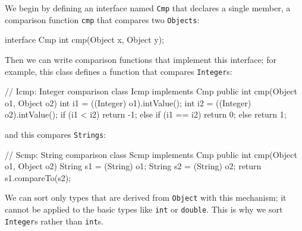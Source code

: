 We begin by defining an interface named \verb'Cmp' that declares a single
member, a comparison function \verb'cmp' that compares two \verb'Objects':
\begin{wellcode}
    interface Cmp {
        int cmp(Object x, Object y);
    }
\end{wellcode}
Then we can write comparison functions that implement this interface; for
example, this class defines a function that compares \verb'Integer's:
\begin{wellcode}
    // Icmp: Integer comparison
    class Icmp implements Cmp {
        public int cmp(Object o1, Object o2)
        {
            int i1 = ((Integer) o1).intValue();
            int i2 = ((Integer) o2).intValue();
            if (i1 < i2)
                return -1;
            else if (i1 == i2)
                return 0;
            else
                return 1;
        }
    }
\end{wellcode}
and this compares \verb'Strings':
\begin{wellcode}
    // Scmp: String comparison
    class Scmp implements Cmp {
        public int cmp(Object o1, Object o2)
        {
            String s1 = (String) o1;
            String s2 = (String) o2;
            return s1.compareTo(s2);
        }
    }
\end{wellcode}
We can sort only types that are derived from \verb'Object' with this
mechanism; it cannot be applied to the basic types like \verb'int' or
\verb'double'. This is why we sort \verb'Integer's rather than \verb'int's.

